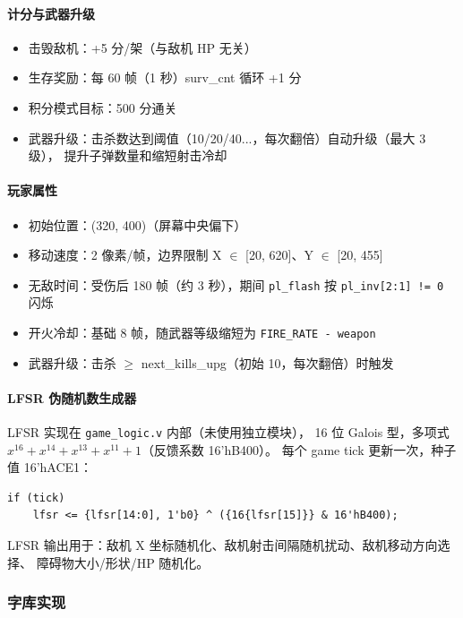 \documentclass[12pt,a4paper]{ctexart}
\begin{document}
\paragraph{计分与武器升级}

\begin{itemize}
    \item 击毁敌机：+5 分/架（与敌机 HP 无关）
    \item 生存奖励：每 60 帧（1 秒）surv\_cnt 循环 +1 分
    \item 积分模式目标：500 分通关
    \item 武器升级：击杀数达到阈值（10/20/40...，每次翻倍）自动升级（最大 3 级），
    提升子弹数量和缩短射击冷却
\end{itemize}

\paragraph{玩家属性}

\begin{itemize}
    \item 初始位置：(320, 400)（屏幕中央偏下）
    \item 移动速度：2 像素/帧，边界限制 X $\in$ [20, 620]、Y $\in$ [20, 455]
    \item 无敌时间：受伤后 180 帧（约 3 秒），期间 \texttt{pl\_flash} 按 \texttt{pl\_inv[2:1] != 0} 闪烁
    \item 开火冷却：基础 8 帧，随武器等级缩短为 \texttt{FIRE\_RATE - weapon}
    \item 武器升级：击杀 $\ge$ next\_kills\_upg（初始 10，每次翻倍）时触发
\end{itemize}

\paragraph{LFSR 伪随机数生成器}

LFSR 实现在 \texttt{game\_logic.v} 内部（未使用独立模块），
16 位 Galois 型，多项式 $x^{16}+x^{14}+x^{13}+x^{11}+1$（反馈系数 16'hB400）。
每个 game tick 更新一次，种子值 16'hACE1：

\begin{lstlisting}
if (tick)
    lfsr <= {lfsr[14:0], 1'b0} ^ ({16{lfsr[15]}} & 16'hB400);
\end{lstlisting}

LFSR 输出用于：敌机 X 坐标随机化、敌机射击间隔随机扰动、敌机移动方向选择、
障碍物大小/形状/HP 随机化。

\subsubsection{字库实现}
\end{document}
